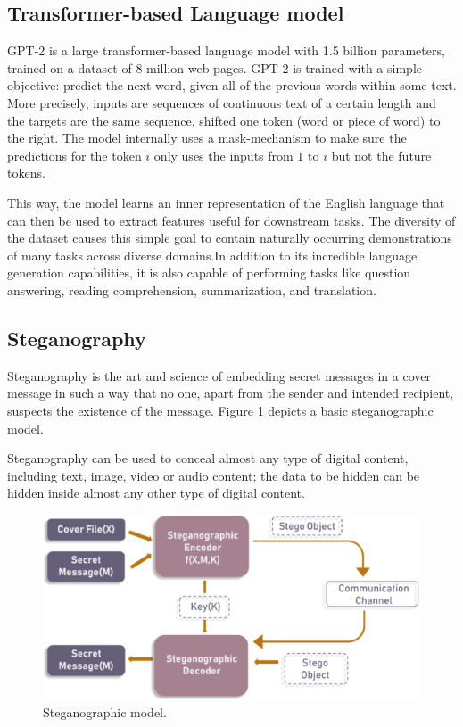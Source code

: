 \documentclass[journal,onecolumn]{IEEEtran}
\begin{document}
\subsection{Transformer-based Language model}
GPT-2 is a large transformer-based language model with 1.5 billion parameters, trained on a dataset of 8 million web pages. GPT-2 is trained with a simple objective: predict the next word, given all of the previous words within some text. More precisely, inputs are sequences of continuous text of a certain length and the targets are the same sequence, shifted one token (word or piece of word) to the right. The model internally uses a mask-mechanism to make sure the predictions for the token $i$ only uses the inputs from $1$ to $i$ but not the future tokens\cite{noauthor_better_2019}.

This way, the model learns an inner representation of the English language that can then be used to extract features useful for downstream tasks. The diversity of the dataset causes this simple goal to contain naturally occurring demonstrations of many tasks across diverse domains.In addition to its incredible language generation capabilities, it is also capable of performing tasks like question answering, reading comprehension, summarization, and translation.



\subsection{Steganography}
Steganography is the art and science of embedding secret messages in a cover message in such a way that no one, apart from the sender and intended recipient, suspects the existence of the message\cite{noauthor_steganography_2019}. Figure \ref{fig:stegano} depicts a basic steganographic model.

Steganography can be used to conceal almost any type of digital content, including text, image, video or audio content; the data to be hidden can be hidden inside almost any other type of digital content.

\begin{figure}[b]
	\centering
	\includegraphics[width=0.5\linewidth]{figures/Stegano.png}
	\caption{Steganographic model.\cite{noauthor_steganography_2019}}
	\label{fig:stegano}
\end{figure}
\end{document}
